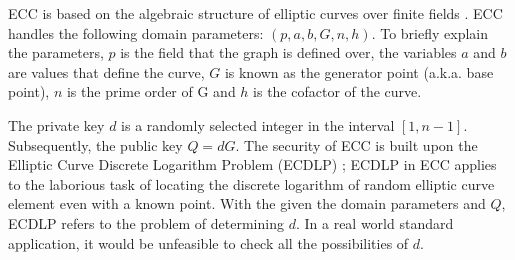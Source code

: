 ECC is based on the algebraic structure of elliptic curves over finite fields \cite{RSA_ECC}. ECC handles the following domain parameters: \((p,a,b,G,n,h)\). To briefly explain the parameters, \(p\) is the field that the graph is defined over, the variables \(a\) and \(b\) are values that define the curve, \(G\) is known as the generator point (a.k.a. base point), \(n\) is the prime order of G and \(h\) is the cofactor of the curve.

The private key \(d\) is a randomly selected integer in the interval \( [ 1 , n - 1 ]\). Subsequently, the public key \(Q=dG\). The security of ECC is built upon the Elliptic Curve Discrete Logarithm Problem (ECDLP) \cite{RSA_ECC}; ECDLP in ECC applies to the laborious task of locating the discrete logarithm of random elliptic curve element even with a known point. With the given the domain parameters and \(Q\), ECDLP refers to the problem of determining \(d\). In a real world standard application, it would be unfeasible to check all the possibilities of \(d\).